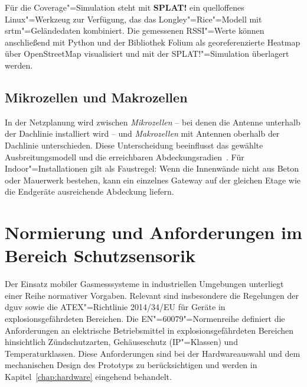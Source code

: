 Für die Coverage"=Simulation steht mit \textbf{SPLAT!} ein quelloffenes Linux"=Werkzeug
zur Verfügung, das das Longley"=Rice"=Modell mit \acrfull{srtm}"=Geländedaten kombiniert.
Die gemessenen RSSI"=Werte können anschließend mit Python und der Bibliothek Folium
als georeferenzierte Heatmap über OpenStreetMap visualisiert und mit der
SPLAT!"=Simulation überlagert werden.

\subsection{Mikrozellen und Makrozellen}
\label{subsec:zellen}

In der Netzplanung wird zwischen \textit{Mikrozellen} -- bei denen die Antenne
unterhalb der Dachlinie installiert wird -- und \textit{Makrozellen} mit Antennen
oberhalb der Dachlinie unterschieden. Diese Unterscheidung beeinflusst das
gewählte Ausbreitungsmodell und die erreichbaren Abdeckungsradien~\cite{walter2006radio}.
Für Indoor"=Installationen gilt als Faustregel: Wenn die Innenwände nicht aus Beton oder
Mauerwerk bestehen, kann ein einzelnes Gateway auf der gleichen Etage wie die
Endgeräte ausreichende Abdeckung liefern.

\section{Normierung und Anforderungen im Bereich Schutzsensorik}
\label{sec:normierung}

Der Einsatz mobiler Gasmesssysteme in industriellen Umgebungen unterliegt einer
Reihe normativer Vorgaben. Relevant sind insbesondere die Regelungen der
\acrshort{dguv} sowie die ATEX"=Richtlinie 2014/34/EU für Geräte in
explosionsgefährdeten Bereichen. Die EN"=60079"=Normenreihe definiert die Anforderungen
an elektrische Betriebsmittel in explosionsgefährdeten Bereichen hinsichtlich
Zündschutzarten, Gehäuseschutz (IP"=Klassen) und Temperaturklassen. Diese
Anforderungen sind bei der Hardwareauswahl und dem mechanischen Design des Prototyps
zu berücksichtigen und werden in Kapitel~\ref{chap:hardware} eingehend behandelt.

